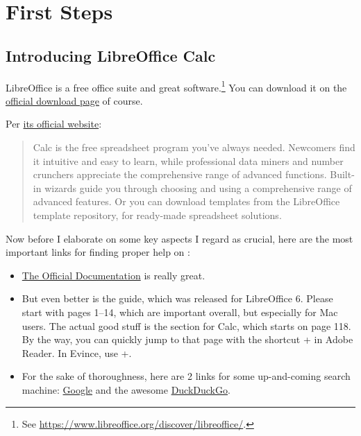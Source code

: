 \section{First Steps}
\label{sec:First-Steps}

\subsection{Introducing LibreOffice Calc}
\label{subsec:libreoffice-calc}

LibreOffice is a free office suite and great software.\footnote{See \href{https://www.libreoffice.org/discover/libreoffice/}{https://www.libreoffice.org/discover/libreoffice/}.}
You can download it on the  \href{https://www.libreoffice.org/download/download/}{official download page} of course.

Per \href{https://www.libreoffice.org/discover/calc/}{its official website}:
\begin{quote}\small
	Calc is the free spreadsheet program you've always needed. Newcomers find it intuitive and easy to learn, while professional data miners and number crunchers appreciate the comprehensive range of advanced functions. Built-in wizards guide you through choosing and using a comprehensive range of advanced features. Or you can download templates from the LibreOffice template repository, for ready-made spreadsheet solutions.
\end{quote}

Now before I elaborate on some key aspects I regard as crucial, here are the most important links for finding proper help on \loc:
\begin{itemize}
	\item \href{https://documentation.libreoffice.org/en/english-documentation/}{The Official Documentation} is really great.
	\item But even better is the  guide, which was released for LibreOffice 6.
	Please start with pages 1--14, which are important overall, but especially for Mac users.
	The actual good stuff is the section for Calc, which starts on page 118.
	By the way, you can quickly jump to that page with the shortcut + in Adobe Reader.
	In Evince, use +.
	\item For the sake of thoroughness, here are 2 links for some up-and-coming search machine: \href{http://www.google.com}{Google} and the awesome \href{https://www.duckduckgo.com}{DuckDuckGo}.
\end{itemize}

